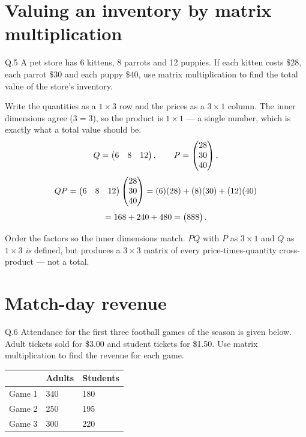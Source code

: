 \section{Valuing an inventory by matrix multiplication}

\begin{question}{Q.5}
A pet store has 6 kittens, 8 parrots and 12 puppies. If each kitten costs \$28,
each parrot \$30 and each puppy \$40, use matrix multiplication to find the
total value of the store's inventory.
\end{question}

\begin{solution}
Write the quantities as a $1\times3$ row and the prices as a $3\times1$ column.
The inner dimensions agree ($3=3$), so the product is $1\times1$ --- a single
number, which is exactly what a total value should be.
\[
Q=\begin{pmatrix}6&8&12\end{pmatrix},\qquad P=\begin{pmatrix}28\\30\\40\end{pmatrix},
\]
\[
QP=\begin{pmatrix}6&8&12\end{pmatrix}\begin{pmatrix}28\\30\\40\end{pmatrix}
=(6)(28)+(8)(30)+(12)(40)
\]
\[
=168+240+480=\begin{pmatrix}888\end{pmatrix}.
\]

\end{solution}

\begin{pitfall}
Order the factors so the inner dimensions match. $PQ$ with $P$ as $3\times1$
and $Q$ as $1\times3$ \emph{is} defined, but produces a $3\times3$ matrix of
every price-times-quantity cross-product --- not a total.
\end{pitfall}

\section{Match-day revenue}

\begin{question}{Q.6}
Attendance for the first three football games of the season is given below.
Adult tickets sold for \$3.00 and student tickets for \$1.50. Use matrix
multiplication to find the revenue for each game.

\medskip
\centering\small\sffamily
\begin{tabular}{@{}l C{2.2cm} C{2.2cm}@{}}
\toprule
 & \textbf{Adults} & \textbf{Students} \\
\midrule
Game 1 & 340 & 180 \\
Game 2 & 250 & 195 \\
Game 3 & 300 & 220 \\
\bottomrule
\end{tabular}
\end{question}

